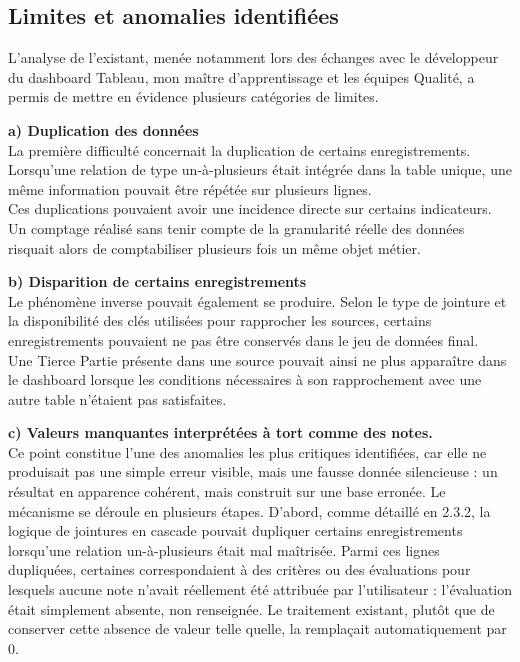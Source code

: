 \subsection{Limites et anomalies identifiées}

L’analyse de l’existant, menée notamment lors des échanges avec le développeur du 
dashboard Tableau, mon maître d’apprentissage et les équipes Qualité, a permis de mettre 
en évidence plusieurs catégories de limites.

\textbf{a) Duplication des données}\\
La première difficulté concernait la duplication de certains enregistrements. Lorsqu’une 
relation de type un-à-plusieurs était intégrée dans la table unique, une même information 
pouvait être répétée sur plusieurs lignes. \\
Ces duplications pouvaient avoir une incidence directe sur certains indicateurs. Un 
comptage réalisé sans tenir compte de la granularité réelle des données risquait alors de 
comptabiliser plusieurs fois un même objet métier.

\textbf{b) Disparition de certains enregistrements}\\
Le phénomène inverse pouvait également se produire. Selon le type de jointure et la 
disponibilité des clés utilisées pour rapprocher les sources, certains enregistrements pouvaient 
ne pas être conservés dans le jeu de données final. \\
Une Tierce Partie présente dans une source pouvait ainsi ne plus apparaître dans le 
dashboard lorsque les conditions nécessaires à son rapprochement avec une autre table 
n’étaient pas satisfaites. 

\textbf{c) Valeurs manquantes interprétées à tort comme des notes. }\\
Ce point constitue l'une des anomalies les plus critiques identifiées, car elle ne produisait 
pas une simple erreur visible, mais une fausse donnée silencieuse : un résultat en apparence 
cohérent, mais construit sur une base erronée. Le mécanisme se déroule en plusieurs étapes. 
D'abord, comme détaillé en 2.3.2, la logique de jointures en cascade pouvait dupliquer certains 
enregistrements lorsqu'une relation un-à-plusieurs était mal maîtrisée. Parmi ces lignes 
dupliquées, certaines correspondaient à des critères ou des évaluations pour lesquels aucune 
note n'avait réellement été attribuée par l'utilisateur : l'évaluation était simplement absente, 
non renseignée. Le traitement existant, plutôt que de conserver cette absence de valeur telle 
quelle, la remplaçait automatiquement par 0. \\


